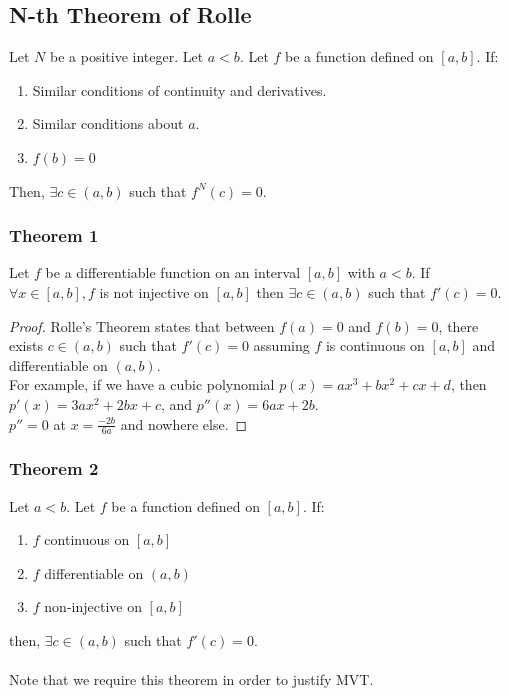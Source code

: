 \documentclass{article}
\begin{document}
\subsection{N-th Theorem of Rolle}
Let $N$ be a positive integer. Let $a < b$. Let $f$ be a function defined on $[a,b]$.
If:
\begin{enumerate}
    \item Similar conditions of continuity and derivatives.
    \item Similar conditions about $a$.
    \item $f(b) = 0$
\end{enumerate}
Then, $\exists c \in (a,b)$ such that $f^N(c) = 0$.

\subsubsection{Theorem 1}
Let $f$ be a differentiable function on an interval $[a,b]$ with $a < b$. If $\forall x \in [a,b], f$ is not injective on $[a,b]$ then $\exists c \in (a,b)$ such that $f'(c) = 0$.
\begin{proof}
Rolle's Theorem states that between $f(a) = 0$ and $f(b) = 0$, there exists $c \in (a,b)$ such that $f'(c) = 0$ assuming $f$ is continuous on $[a,b]$ and differentiable on $(a,b)$.\\
For example, if we have a cubic polynomial $p(x) = ax^3 + bx^2 + cx + d$, then $p'(x) = 3ax^2 + 2bx + c$, and $p''(x) = 6ax + 2b$.\\
$p'' = 0$ at $x = \frac{-2b}{6a}$ and nowhere else.
\end{proof}

\subsubsection{Theorem 2}
Let $a < b$. Let $f$ be a function defined on $[a,b]$. If:
\begin{enumerate}
    \item $f$ continuous on $[a,b]$
    \item $f$ differentiable on $(a,b)$
    \item $f$ non-injective on $[a,b]$
\end{enumerate}
then, $\exists c \in (a,b)$ such that $f'(c) = 0$.
\\
\\
Note that we require this theorem in order to justify MVT.
\end{document}
